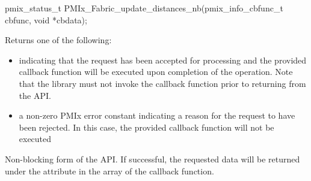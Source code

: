 \format

\cspecificstart
\begin{codepar}
pmix_status_t
PMIx_Fabric_update_distances_nb(pmix_info_cbfunc_t cbfunc,
                                void *cbdata);
\end{codepar}
\cspecificend

\begin{arglist}
\end{arglist}

Returns one of the following:

\begin{itemize}
\item {} indicating that the request has been accepted for processing and the provided callback function will be executed upon completion of the operation. Note that the library must not invoke the callback function prior to returning from the \ac{API}.
\item a non-zero \ac{PMIx} error constant indicating a reason for the request to have been rejected. In this case, the provided callback function will not be executed
\end{itemize}


\descr

Non-blocking form of the  \ac{API}. If successful, the requested data will be returned under the  attribute in the  array of the callback function.

